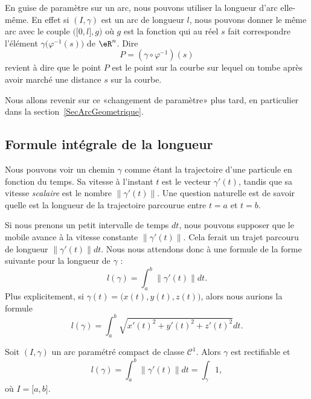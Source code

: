 En guise de paramètre sur un arc, nous pouvons utiliser la longueur d'arc elle-même. En effet si $(I,\gamma)$ est un arc de longueur $l$, nous pouvons donner le même arc avec le couple $\big( \mathopen[ 0 , l \mathclose],g \big)$ où $g$ est la fonction qui au réel $s$ fait correspondre l'élément $\gamma\big( \varphi^{-1}(s) \big)$ de $\eR^n$. Dire
\begin{equation}
    P=(\gamma\circ\varphi^{-1})(s)
\end{equation}
revient à dire que le point $P$ est le point sur la courbe sur lequel on tombe après avoir marché une distance $s$ sur la courbe.

Nous allons revenir sur ce «changement de paramètre» plus tard, en particulier dans la section~\ref{SecArcGeometrique}.

\subsection{Formule intégrale de la longueur}

Nous pouvons voir un chemin $\gamma$ comme étant la trajectoire d'une particule en fonction du temps. Sa vitesse à l'instant $t$ est le vecteur $\gamma'(t)$, tandis que sa vitesse \emph{scalaire} est le nombre $\| \gamma'(t) \|$. Une question naturelle est de savoir quelle est la longueur de la trajectoire parcourue entre $t=a$ et $t=b$.

Si nous prenons un petit intervalle de temps $dt$, nous pouvons supposer que le mobile avance à la vitesse constante $\| \gamma'(t) \|$. Cela ferait un trajet parcouru de longueur $\| \gamma'(t) \|dt$. Nous nous attendons donc à une formule de la forme suivante pour la longueur de \( \gamma\) :
\begin{equation}        \label{EqDefLongueurChemin}
    l(\gamma)=\int_a^b\| \gamma'(t) \|dt.
\end{equation}
Plus explicitement, si $\gamma(t)=\big( x(t),y(t),z(t) \big)$, alors nous aurions la formule
\begin{equation}
    l(\gamma)=\int_a^b\sqrt{x'(t)^2+y'(t)^2+z'(t)^2}dt.
\end{equation}


\begin{theorem}     \label{ThoLongueurIntegrale}
    Soit $(I,\gamma)$ un arc paramétré compact de classe $\mathcal{C}^1$. Alors $\gamma$ est rectifiable et
    \begin{equation}        \label{EqLongGammalInt}
        l(\gamma)=\int_a^b\| \gamma'(t) \|dt=\int_{\gamma}1,
    \end{equation}
    où $I=\mathopen[ a , b \mathclose]$.
\end{theorem}

